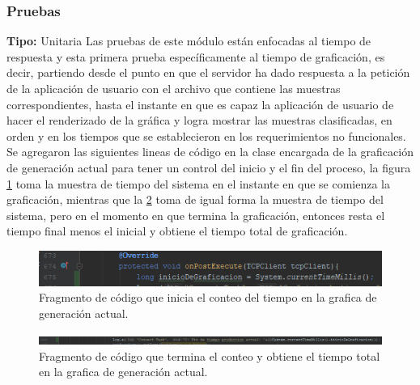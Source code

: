 \subsubsection{Pruebas}
\textbf{Tipo: }Unitaria \newline
Las pruebas de este módulo están enfocadas al tiempo de respuesta y esta primera prueba específicamente al tiempo de graficación, es decir, partiendo desde el punto en que el servidor ha dado respuesta a la petición de la aplicación de usuario con el archivo que contiene las muestras correspondientes, hasta el instante en que es capaz la aplicación de usuario de hacer el renderizado de la gráfica y logra mostrar las muestras clasificadas, en orden y en los tiempos que se establecieron en los requerimientos no funcionales. \\ \newline
Se agregaron las siguientes lineas de código en la clase encargada de la graficación de generación actual para tener un control del inicio y el fin del proceso, la figura \ref{fig:Tiempo_Graficacion} toma la muestra de tiempo del sistema en el instante en que se comienza la graficación, mientras que la \ref{fig:Tiempo_Graficacion2} toma de igual forma la muestra de tiempo del sistema, pero en el momento en que termina la graficación, entonces resta el tiempo final menos el inicial y obtiene el tiempo total de graficación. \\ \newline

\begin{figure}[H]
	\centering
	\includegraphics[scale=.6]{Capitulo5/images/TiempoGraficacionCodigo.png}
	\caption{Fragmento de código que inicia el conteo del tiempo en la grafica de generación actual.}	\label{fig:Tiempo_Graficacion}
\end{figure} 

\begin{figure}[H]
	\centering
	\includegraphics[scale=.6]{Capitulo5/images/TiempoGraficacionCodigo2.png}
	\caption{Fragmento de código que termina el conteo y obtiene el tiempo total en la grafica de generación actual.}	\label{fig:Tiempo_Graficacion2}
\end{figure} 

